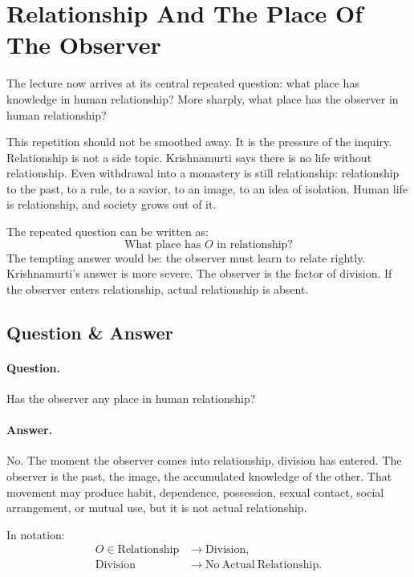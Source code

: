\section{Relationship And The Place Of The Observer}

The lecture now arrives at its central repeated question: what place has knowledge in human relationship? More sharply, what place has the observer in human relationship?

This repetition should not be smoothed away. It is the pressure of the inquiry. Relationship is not a side topic. Krishnamurti says there is no life without relationship. Even withdrawal into a monastery is still relationship: relationship to the past, to a rule, to a savior, to an image, to an idea of isolation. Human life is relationship, and society grows out of it.

The repeated question can be written as:
\begin{equation}
\text{What place has } O \text{ in relationship?}
\end{equation}
The tempting answer would be: the observer must learn to relate rightly. Krishnamurti's answer is more severe. The observer is the factor of division. If the observer enters relationship, actual relationship is absent.

\subsection{Question \& Answer}

\paragraph{Question.}
Has the observer any place in human relationship?

\paragraph{Answer.}
No. The moment the observer comes into relationship, division has entered. The observer is the past, the image, the accumulated knowledge of the other. That movement may produce habit, dependence, possession, sexual contact, social arrangement, or mutual use, but it is not actual relationship.

In notation:
\begin{align}
O \in \mathrm{Relationship}
&\longrightarrow \mathrm{Division},\\
\mathrm{Division}
&\longrightarrow \mathrm{No\ Actual\ Relationship}.
\end{align}

